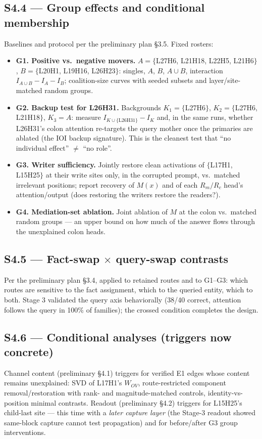 \subsection{S4.4 --- Group effects and conditional membership}
\label{sec:groups}
Baselines and protocol per the preliminary plan \S3.5. Fixed rosters:
\begin{itemize}[leftmargin=1.4em]
  \item \textbf{G1. Positive vs.\ negative movers.} $A=\{$L27H6, L21H18, L22H5,
        L21H6$\}$, $B=\{$L20H1, L19H16, L26H23$\}$: singles, $A$, $B$, $A\cup B$,
        interaction $I_{A\cup B}-I_A-I_B$; coalition-size curves with seeded subsets
        and layer/site-matched random groups.
  \item \textbf{G2. Backup test for L26H31.} Backgrounds $K_1=\{$L27H6$\}$,
        $K_2=\{$L27H6, L21H18$\}$, $K_3=A$: measure $I_{K\cup\{\mathrm{L26H31}\}}-I_K$
        and, in the same runs, whether L26H31's colon attention re-targets the query
        mother once the primaries are ablated (the IOI backup signature). This is the
        cleanest test that ``no individual effect'' $\ne$ ``no role''.
  \item \textbf{G3. Writer sufficiency.} Jointly restore clean activations of
        $\{$L17H1, L15H25$\}$ at their write sites only, in the corrupted prompt,
        vs.\ matched irrelevant positions; report recovery of $M(x)$ and of each
        $R_m/R_c$ head's attention/output (does restoring the writers restore the
        readers?).
  \item \textbf{G4. Mediation-set ablation.} Joint ablation of $M$ at the colon vs.\
        matched random groups --- an upper bound on how much of the answer flows through
        the unexplained colon heads.
\end{itemize}

\subsection{S4.5 --- Fact-swap $\times$ query-swap contrasts}
Per the preliminary plan \S3.4, applied to retained routes and to G1--G3: which routes
are sensitive to the fact assignment, which to the queried entity, which to both.
Stage 3 validated the query axis behaviorally (38/40 correct, attention follows the
query in 100\% of families); the crossed condition completes the design.

\subsection{S4.6 --- Conditional analyses (triggers now concrete)}
Channel content (preliminary \S4.1) triggers for verified E1 edges whose content
remains unexplained: SVD of L17H1's $W_{OV}$, route-restricted component
removal/restoration with rank- and magnitude-matched controls, identity-vs-position
minimal contrasts. Readout (preliminary \S4.2) triggers for L15H25's child-last site
--- this time with a \emph{later capture layer} (the Stage-3 readout showed same-block
capture cannot test propagation) and for before/after G3 group interventions.

